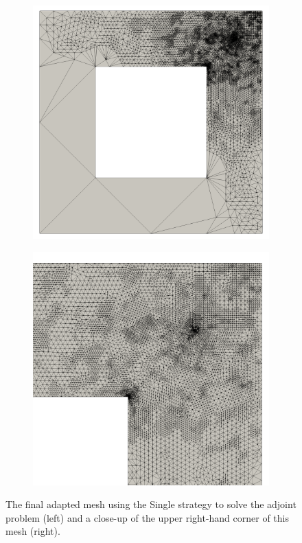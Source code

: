 %
\begin{figure}[ht!]
\centering
\begin{subfigure}{.5\textwidth}
\centering
\includegraphics[width=.99\linewidth]{img/refine_squarehole_single.png}
\end{subfigure}%
\begin{subfigure}{0.5\textwidth}
\centering
\includegraphics[width=.99\linewidth]{img/refine_squarehole_single_close.png}
\end{subfigure}
\caption{The final adapted mesh using the Single strategy to
solve the adjoint problem (left) and a close-up of the upper right-hand
corner of this mesh (right).}
\label{fig:refine_single_adapted}
\end{figure}


